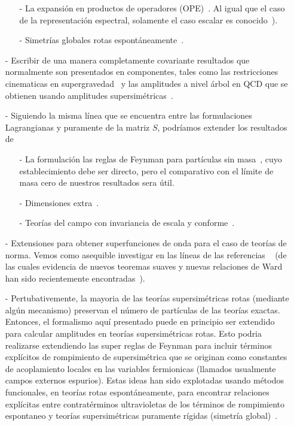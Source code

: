 \begin{itemize}
\begin{itemize}
\item[-] La expansión en productos de operadores (OPE)~\cite{Wilson:1969zs}.  Al igual que el caso de la representación espectral, solamente el caso escalar es conocido~\cite{Leroy:1986ve}).
\item[-] Simetrías globales rotas espontáneamente~\cite{Goldstone:1962es}.
\end{itemize}
\item[-] Escribir de una manera completamente covariante resultados que normalmente son presentados en componentes, tales  como las restricciones cinematicas en supergravedad~\cite{Grisaru:1976vm} y las amplitudes a nivel árbol en QCD que se obtienen usando amplitudes supersimétricas~\cite{Dixon:1996wi}.  
\item[-] Siguiendo la misma línea que se encuentra entre las formulaciones Lagrangianas y puramente de la matriz $ S $, podríamos extender los resultados de 
\begin{itemize}
\item[-] La formulación las reglas de Feynman para partículas sin masa~\cite{Weinberg:1964ev}, cuyo establecimiento debe ser directo, pero el comparativo con el límite de masa cero de  nuestros resultados sera útil. 
\item[-] Dimensiones extra~\cite{Weinberg:1984vb}.
\item[-] Teorías del campo  con invariancia de escala y conforme~\cite{Chan:1973iq,Weinberg:2012cd}.
\end{itemize}
\item[-] Extensiones para obtener superfunciones de onda  para el caso de teorías de norma. Vemos como  asequible investigar en las líneas de las referencias ~\cite{Weinberg:1965rz,Weinberg:1965nx,Grisaru:1976vm} (de las cuales  evidencia de nuevos teoremas suaves y nuevas relaciones de Ward han sido recientemente encontradas~\cite{Cachazo:2014fwa,He:2014laa}).
\item[-] Pertubativemente, la mayoria de las teorías supersimétricas rotas (mediante algún mecanismo) preservan el número de partículas de las teorías exactas. Entonces, el formalismo aquí presentado puede  en principio ser extendido para calcular amplitudes en teorías supersimétricas rotas. Esto podria realizarse extendiendo las super reglas de Feynman para incluir términos explícitos de rompimiento de supersimétrica que se originan como constantes de acoplamiento locales en las variables fermionicas (llamados usualmente campos externos espurios). Estas ideas han sido explotadas usando métodos funcionales, en teorías rotas espontáneamente, para encontrar relaciones explícitas entre contratérminos ultravioletas de los términos de rompimiento espontaneo y teorías supersimétricas puramente rígidas (simetría global)~\cite{Avdeev:1997vx,Kobayashi:1998jq}.
\end{itemize}